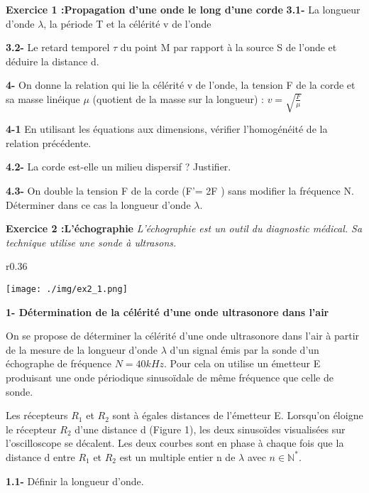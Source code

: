 \documentclass[12pt, french]{article}
\begin{document}
\begin{Box2}{\textbf{Exercice 1 :Propagation d'une onde le long d'une corde }}
\textbf{3.1- }La longueur d'onde $\lambda$, la période T et la célérité v de l'onde

\textbf{3.2- }Le retard temporel $\tau$ du point M par rapport à la source S de l'onde et déduire la distance d.

\textbf{4- }On donne la relation qui lie la célérité v de l'onde, la tension F de la corde et sa masse linéique $\mu$ (quotient de la masse sur la longueur) : $v = \sqrt{\frac{F}{\mu}}$

\textbf{4-1 }En utilisant les équations aux dimensions, vérifier l'homogénéité de la relation précédente.

\textbf{4.2- }La corde est-elle un milieu dispersif ? Justifier.


\textbf{4.3- }On double la tension F de la corde (F'= 2F ) sans modifier la fréquence N.
Déterminer dans ce cas la longueur d'onde $\lambda$.
\end{Box2}
\begin{tcolorbox}\textbf{Exercice 2 :L’échographie }
	\emph{L’échographie est un outil du diagnostic médical. Sa technique utilise une sonde à ultrasons.}

\end{tcolorbox}
\begin{wrapfigure}[6]{r}{0.36\textwidth}
  \begin{center}
	  \vspace{-0.6cm}
	\texttt{[image: ./img/ex2\_1.png]}
  \end{center}
\end{wrapfigure}

	\textbf{ 1- Détermination de la célérité d’une onde
ultrasonore dans l’air}
	
On se propose de déterminer la célérité d’une onde
ultrasonore dans l’air à partir de la mesure de la
longueur d’onde $\lambda$ d’un signal émis par la sonde
d’un échographe de fréquence $N=40kHz$. Pour
cela on utilise un émetteur E produisant une
onde périodique sinusoïdale de même
fréquence que celle de sonde.

Les récepteurs $R_1$ et $R_2$ sont à égales distances de l'émetteur E. Lorsqu'on éloigne le récepteur $R_2$
d'une distance d (Figure 1), les deux sinusoïdes visualisées sur l'oscilloscope se décalent. Les deux
courbes sont en phase à chaque fois que la distance d entre $R_1$ et $R_2$ est un multiple entier n de $\lambda$
avec $n \in \mathbb{N}^*$.

\textbf{1.1- }Définir la longueur d'onde.
\end{document}
